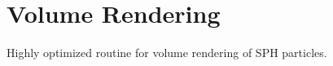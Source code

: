 \section{Volume Rendering}
\label{visualization}

Highly optimized routine for volume rendering of SPH particles.